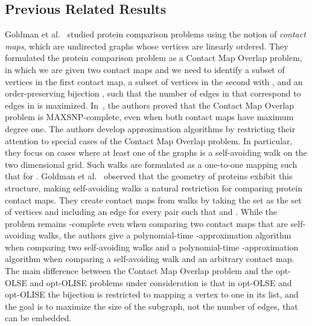 \documentclass[11pt]{article}
\newcommand{\NP}{\mbox{}}
\begin{document}
\subsection{Previous Related Results}\label{subsec:previous}
Goldman et al.~\cite{Goldman1999} studied protein comparison problems using the notion of {\em contact maps}, which are undirected graphs whose vertices are linearly ordered. They formulated the protein comparison problem as a {\sc Contact Map Overlap} problem, in which we are given two contact maps and we need to identify a subset of vertices  in the first contact map, a subset of vertices  in the second with , and an order-preserving bijection , such that the number of edges in  that correspond to edges in  is maximized. In~\cite{Goldman1999}, the authors proved that the {\sc Contact Map Overlap} problem is MAXSNP-complete, even when both contact maps have maximum degree one. The authors develop approximation algorithms by restricting their attention to special cases of the {\sc Contact Map Overlap} problem. In particular, they focus on cases where at least one of the graphs is a self-avoiding walk on the two dimensional grid.  Such walks are formulated as a one-to-one mapping  such that  for .  Goldman et al.~\cite{Goldman1999} observed that the geometry of proteins exhibit this structure, making self-avoiding walks a natural restriction for comparing protein contact maps.  They create contact maps from walks by taking the set  as the set of vertices and including an edge for every pair  such that  and . While the problem remains \NP-complete even when comparing two contact maps that are self-avoiding walks, the authors give a polynomial-time -approximation algorithm when comparing two self-avoiding walks and a polynomial-time -approximation algorithm when comparing a self-avoiding walk and an arbitrary contact map. The main difference between the {\sc Contact Map Overlap} problem and the opt-OLSE and opt-OLISE problems under consideration is that in opt-OLSE and opt-OLISE the bijection  is restricted to mapping a vertex to one in its list, and the goal is to maximize the size of the subgraph, not the number of edges, that can be embedded.
\end{document}
